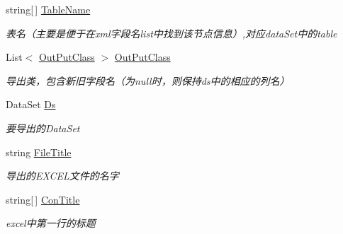 \begin{DoxyCompactItemize}
\item 
string\mbox{[}$\,$\mbox{]} \hyperlink{class_x_c_l_net_tools_1_1_entity_1_1_office_1_1_excel_handler_1_1_out_put_param_class_a0a911a788ec6d71dd31abd3624400b67}{Table\+Name}
\begin{DoxyCompactList}\small\item\em 表名（主要是便于在xml字段名list中找到该节点信息）,对应data\+Set中的table \end{DoxyCompactList}\item 
List$<$ \hyperlink{class_x_c_l_net_tools_1_1_entity_1_1_office_1_1_excel_handler_1_1_out_put_class}{Out\+Put\+Class} $>$ \hyperlink{class_x_c_l_net_tools_1_1_entity_1_1_office_1_1_excel_handler_1_1_out_put_param_class_adc8f68c8e223e5653d29efabacc56b65}{Out\+Put\+Class}
\begin{DoxyCompactList}\small\item\em 导出类，包含新旧字段名（为null时，则保持ds中的相应的列名） \end{DoxyCompactList}\item 
Data\+Set \hyperlink{class_x_c_l_net_tools_1_1_entity_1_1_office_1_1_excel_handler_1_1_out_put_param_class_a3f2d60db6c0602122169dd392caed6c0}{Ds}
\begin{DoxyCompactList}\small\item\em 要导出的\+Data\+Set \end{DoxyCompactList}\item 
string \hyperlink{class_x_c_l_net_tools_1_1_entity_1_1_office_1_1_excel_handler_1_1_out_put_param_class_a9825b6c0aa98a7e758376b5de8af1991}{File\+Title}
\begin{DoxyCompactList}\small\item\em 导出的\+E\+X\+C\+E\+L文件的名字 \end{DoxyCompactList}\item 
string\mbox{[}$\,$\mbox{]} \hyperlink{class_x_c_l_net_tools_1_1_entity_1_1_office_1_1_excel_handler_1_1_out_put_param_class_a0acbd053010430b65a37f7c0b28e122e}{Con\+Title}
\begin{DoxyCompactList}\small\item\em excel中第一行的标题 \end{DoxyCompactList}\item 

\end{DoxyCompactItemize}
